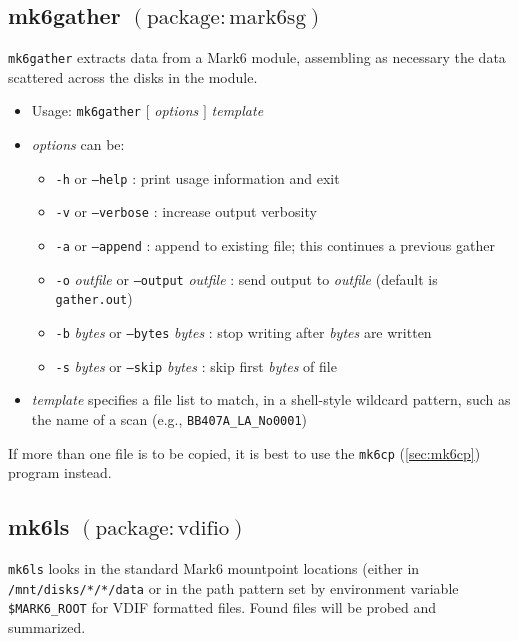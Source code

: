 
\subsection{mk6gather {\small $\mathrm{(package: mark6sg)}$} \label{sec:mk6gather}}

{\tt mk6gather} extracts data from a Mark6 module, assembling as necessary the data scattered across the disks in the module.

\begin{itemize}
\item[] Usage: {\tt mk6gather} $[$ {\em options} $]$ {\em template}
\item[] {\em options} can be:
\begin{itemize}
\item[] {\tt -h} or {\tt --help} : print usage information and exit
\item[] {\tt -v} or {\tt --verbose} : increase output verbosity
\item[] {\tt -a} or {\tt --append} : append to existing file; this continues a previous gather
\item[] {\tt -o} {\em outfile} or {\tt --output} {\em outfile} : send output to {\em outfile} (default is {\tt gather.out})
\item[] {\tt -b} {\em bytes} or {\tt --bytes} {\em bytes} : stop writing after {\em bytes} are written
\item[] {\tt -s} {\em bytes} or {\tt --skip} {\em bytes} : skip first {\em bytes} of file
\end{itemize}
\item[] {\em template} specifies a file list to match, in a shell-style wildcard pattern, such as the name of a scan (e.g., {\tt BB407A\_LA\_No0001})
\end{itemize}

If more than one file is to be copied, it is best to use the {\tt mk6cp} (\ref{sec:mk6cp}) program instead. 





\subsection{mk6ls {\small $\mathrm{(package: vdifio)}$} \label{sec:mk6ls}}

{\tt mk6ls} looks in the standard Mark6 mountpoint locations (either in {\tt /mnt/disks/*/*/data} or in the path pattern set by environment variable {\tt \$MARK6\_ROOT} for VDIF formatted files.
Found files will be probed and summarized.

